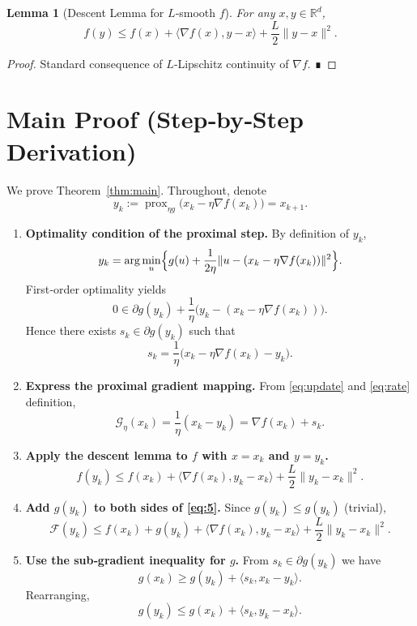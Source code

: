 \documentclass{article}
\newtheorem{lemma}{Lemma}
\newcommand{\prox}{\operatorname{prox}}
\newcommand{\grad}{\nabla}
\newcommand{\R}{\mathbb{R}}
\newcommand{\G}{\mathcal{G}}
\newcommand{\F}{\mathcal{F}}
\begin{document}
\begin{lemma}[Descent Lemma for $L$‑smooth $f$]\label{lem:descent}
For any $x,y\in\R^{d}$,
\[
f(y)\le f(x)+\langle\grad f(x),y-x\rangle+\frac{L}{2}\|y-x\|^{2}.
\]
\end{lemma}
\begin{proof}
Standard consequence of $L$‑Lipschitz continuity of $\grad f$. ∎
\end{proof}

\section*{Main Proof (Step‑by‑Step Derivation)}
We prove Theorem~\ref{thm:main}. Throughout, denote
\[
y_{k}:=\prox_{\eta g}\bigl(x_{k}-\eta\grad f(x_{k})\bigr)=x_{k+1}.
\]

\begin{enumerate}
\item[Step 1.] \textbf{Optimality condition of the proximal step.}  
By definition of $y_{k}$,
\[
y_{k}=\arg\min_{u}\Bigl\{g(u)+\frac{1}{2\eta}\|u-(x_{k}-\eta\grad f(x_{k}))\|^{2}\Bigr\}.
\]
First‑order optimality yields
\begin{equation}
0\in\partial g(y_{k})+\frac{1}{\eta}\bigl(y_{k}-(x_{k}-\eta\grad f(x_{k}))\bigr).
\tag{2}
\end{equation}
Hence there exists $s_{k}\in\partial g(y_{k})$ such that
\[
s_{k}= \frac{1}{\eta}\bigl(x_{k}-\eta\grad f(x_{k})-y_{k}\bigr).
\tag{3}
\]

\item[Step 2.] \textbf{Express the proximal gradient mapping.}  
From \eqref{eq:update} and \eqref{eq:rate} definition,
\[
\G_{\eta}(x_{k})=\frac{1}{\eta}(x_{k}-y_{k})= \grad f(x_{k})+s_{k}.
\tag{4}
\]

\item[Step 3.] \textbf{Apply the descent lemma to $f$ with $x=x_{k}$ and $y=y_{k}$.}
\[
f(y_{k})\le f(x_{k})+\langle\grad f(x_{k}),y_{k}-x_{k}\rangle+\frac{L}{2}\|y_{k}-x_{k}\|^{2}.
\tag{5}
\]

\item[Step 4.] \textbf{Add $g(y_{k})$ to both sides of \eqref{eq:5}.}  
Since $g(y_{k})\le g(y_{k})$ (trivial),
\[
\F(y_{k})\le f(x_{k})+g(y_{k})+\langle\grad f(x_{k}),y_{k}-x_{k}\rangle+\frac{L}{2}\|y_{k}-x_{k}\|^{2}.
\tag{6}
\]

\item[Step 5.] \textbf{Use the sub‑gradient inequality for $g$.}  
From $s_{k}\in\partial g(y_{k})$ we have
\[
g(x_{k})\ge g(y_{k})+\langle s_{k},x_{k}-y_{k}\rangle.
\tag{7}
\]
Rearranging,
\[
g(y_{k})\le g(x_{k})+\langle s_{k},y_{k}-x_{k}\rangle .
\tag{8}
\]


\end{enumerate}
\end{document}
